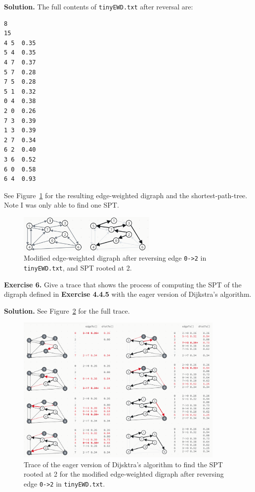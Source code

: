 \documentclass[12pt, a4paper]{article}
\newenvironment{ex}[2][Exercise]
{\par\medskip\noindent \textbf{#1 #2.}}
{\medskip}
\newenvironment{sol}[1][Solution]
{\par\medskip\noindent \textbf{#1.} }
{\medskip}
\begin{document}
	\begin{sol}
		The full contents of \texttt{tinyEWD.txt} after reversal are:
		\begin{lstlisting}[language={}]
8
15
4 5  0.35
5 4  0.35
4 7  0.37
5 7  0.28
7 5  0.28
5 1  0.32
0 4  0.38
2 0  0.26
7 3  0.39
1 3  0.39
2 7  0.34
6 2  0.40
3 6  0.52
6 0  0.58
6 4  0.93
		\end{lstlisting}
		See Figure~\ref{fig:ex-05} for the resulting edge-weighted digraph and the
		shortest-path-tree. Note I was only able to find one SPT.
		\begin{figure}
			\centering
			\includegraphics[width=0.6\textwidth]{exercise-05}
			\caption{Modified edge-weighted digraph after reversing edge \texttt{0->2}
			in \texttt{tinyEWD.txt}, and SPT rooted at 2.}
			\label{fig:ex-05}
		\end{figure}
	\end{sol}
	\begin{ex}{6}
		Give a trace that shows the process of computing the SPT of the digraph defined
		in \textbf{Exercise 4.4.5} with the eager version of Dijkstra's algorithm.
	\end{ex}
	\begin{sol}
		See Figure~\ref{fig:ex-06} for the full trace.
		\begin{figure}
			\centering
			\includegraphics[width=0.9\textwidth]{exercise-06}
			\caption{Trace of the eager version of Dijsktra's algorithm to find the SPT
				rooted at 2 for the modified edge-weighted digraph after reversing edge
				\texttt{0->2} in \texttt{tinyEWD.txt}.}
			\label{fig:ex-06}
		\end{figure}
	\end{sol}
\end{document}
